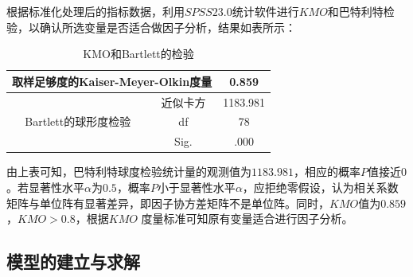 \documentclass{whutmod}
\begin{document}
		\subsubsection{}
		根据标准化处理后的指标数据，利用$SPSS23.0$统计软件进行$KMO$和巴特利特检验，以确认所选变量是否适合做因子分析，结果如表\label{tab1}所示：
		\begin{table}[H]
			\centering
			\caption{KMO和Bartlett的检验}\label{tab1}
			\begin{tabular}{cc|cc|cc}
				\toprule[1.5pt]
				\multicolumn{4}{c|}{取样足够度的Kaiser-Meyer-Olkin度量} & \multicolumn{2}{c}{0.859} \\
				\midrule
				\multicolumn{2}{c|}{\multirow{3}[2]{*}{Bartlett的球形度检验}} & \multicolumn{2}{c|}{近似卡方} & \multicolumn{2}{c}{1183.981} \\
				\multicolumn{2}{c|}{} & \multicolumn{2}{c|}{df} & \multicolumn{2}{c}{78} \\
				\multicolumn{2}{c|}{} & \multicolumn{2}{c|}{Sig.} & \multicolumn{2}{c}{.000} \\
				\bottomrule[2pt]
			\end{tabular}%
			\label{tab:addlabel}%
		\end{table}%
		
		由上表可知，巴特利特球度检验统计量的观测值为$1183.981$，相应的概率$P$值接近$0$。若显著性水平$α$为$0.5$，概率$P$小于显著性水平$α$，应拒绝零假设，认为相关系数矩阵与单位阵有显著差异，即因子协方差矩阵不是单位阵。同时，$KMO$值为$0.859$，$KMO>0.8$，根据$KMO$ 度量标准可知原有变量适合进行因子分析。
		
		
		

	\subsection{模型的建立与求解}
\end{document}

